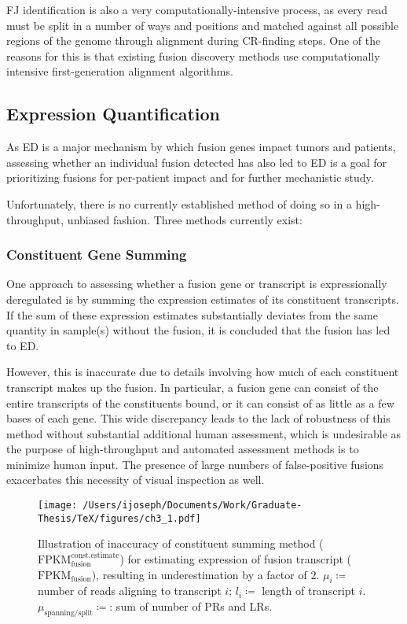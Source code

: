 FJ identification is also a very computationally-intensive process, as every read must be split in a number of ways and positions and matched against all possible regions of the genome through alignment during CR-finding steps. One of the reasons for this is that existing fusion discovery methods use computationally intensive first-generation alignment algorithms. 

\subsection{Expression Quantification}

As ED is a major mechanism by which fusion genes impact tumors and patients, assessing whether an individual fusion detected has also led to ED is a goal for prioritizing fusions for per-patient impact and for further mechanistic study.

Unfortunately, there is no currently established method of doing so in a high-throughput, unbiased fashion. Three methods currently exist:

\subsubsection{Constituent Gene Summing}

One approach to assessing whether a fusion gene or transcript is expressionally deregulated is by summing the expression estimates of its constituent transcripts. If the sum of these expression estimates substantially deviates from the same quantity in sample(s) without the fusion, it is concluded that the fusion has led to ED.

However, this is inaccurate due to details involving how much of each constituent transcript makes up the fusion. In particular, a fusion gene can consist of the entire transcripts of the constituents bound, or it can consist of as little as a few bases of each gene. This wide discrepancy leads to the lack of robustness of this method without substantial additional human assessment, which is undesirable as the purpose of high-throughput and automated assessment methods is to minimize human input. The presence of large numbers of false-positive fusions exacerbates this necessity of visual inspection as well.

\begin{center}
\begin{figure}\centering
  \parbox{.9\textwidth}{\centering
\noindent \texttt{[image: /Users/ijoseph/Documents/Work/Graduate-Thesis/TeX/figures/ch3\_1.pdf]}
    \caption{Illustration of inaccuracy of constituent summing method ($\mathrm{FPKM}_{\mathrm{fusion}}^{\mathrm{const.estimate}}$) for estimating expression of fusion transcript ($\mathrm{FPKM}_\mathrm{fusion}$), resulting in underestimation by a factor of $2$. $\mu_i \coloneqq$ number of reads aligning to transcript $i$; $l_i \coloneqq$ length of transcript $i$. $\mu_{\text{spanning/split}} \coloneqq$: sum of number of PRs and LRs.}}
\end{figure}
\end{center}


